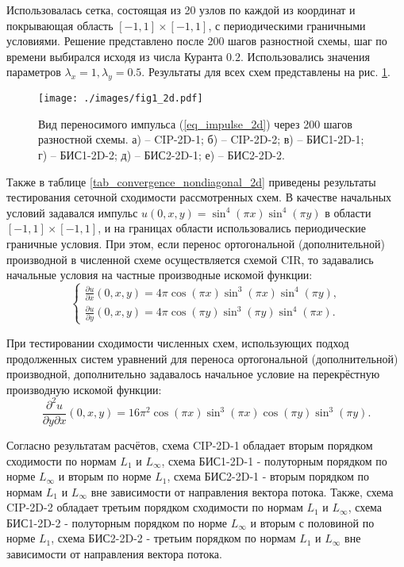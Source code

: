 \documentclass[11pt]{article}
\begin{document}
Использовалась сетка, состоящая из 20 узлов по каждой из координат и покрывающая область $[-1,1]\times[-1,1]$, с периодическими граничными условиями.
Решение представлено после 200 шагов разностной схемы, шаг по времени выбирался исходя из числа Куранта $0.2$.
Использовались значения параметров $\lambda_x = 1, \lambda_y = 0.5$.
Результаты для всех схем представлены на рис. \ref{img_impulse_2d}.

\begin{figure}[!h]
\begin{center}
\texttt{[image: ./images/fig1\_2d.pdf]}
\caption{
Вид переносимого импульса (\ref{eq_impulse_2d}) через 200 шагов разностной схемы.
а) -- CIP-2D-1; б) -- CIP-2D-2; в) -- БИС1-2D-1; г) -- БИС1-2D-2; д) -- БИС2-2D-1; е) -- БИС2-2D-2.
}
\label{img_impulse_2d}
\end{center}
\end{figure}

Также в таблице \ref{tab_convergence_nondiagonal_2d} приведены результаты тестирования сеточной сходимости рассмотренных схем.
В качестве начальных условий задавался импульс $u(0, x, y) = \sin^4(\pi x)\sin^4(\pi y)$ в области $[-1,1]\times[-1,1]$, и на границах области использовались периодические граничные условия.
При этом, если перенос ортогональной (дополнительной) производной в численной схеме осуществляется схемой CIR, то задавались начальные условия на частные производные искомой функции:
\begin{equation}
\label{eq_partial_derivatives}
\begin{cases}
\frac{\partial u}{\partial x} (0, x, y) = 4\pi\cos(\pi x)\sin^3(\pi x)\sin^4(\pi y), \\
\frac{\partial u}{\partial y} (0, x, y) = 4\pi\cos(\pi y)\sin^3(\pi y)\sin^4(\pi x).
\end{cases}
\end{equation}

При тестировании сходимости численных схем, использующих подход продолженных систем уравнений для переноса ортогональной (дополнительной) производной, дополнительно задавалось начальное условие на перекрёстную производную искомой функции:
\begin{equation}
\label{eq_cross_derivative}
\frac{\partial^2 u}{\partial y \partial x} (0, x, y) = 16\pi^2\cos(\pi x)\sin^3(\pi x)\cos(\pi y)\sin^3(\pi y).
\end{equation}


Согласно результатам расчётов, схема CIP-2D-1 обладает вторым порядком сходимости по нормам $L_1$ и $L_{\infty}$,
схема БИС1-2D-1 - полуторным порядком по норме $L_{\infty}$ и вторым по норме $L_1$, схема БИС2-2D-1 -
вторым порядком по нормам $L_1$ и $L_{\infty}$ вне зависимости от направления вектора потока.
Также, схема CIP-2D-2 обладает третьим порядком сходимости по нормам $L_1$ и $L_{\infty}$,
схема БИС1-2D-2 - полуторным порядком по норме $L_{\infty}$ и вторым с половиной по норме $L_1$, схема БИС2-2D-2 -
третьим порядком по нормам $L_1$ и $L_{\infty}$ вне зависимости от направления вектора потока.
\end{document}
